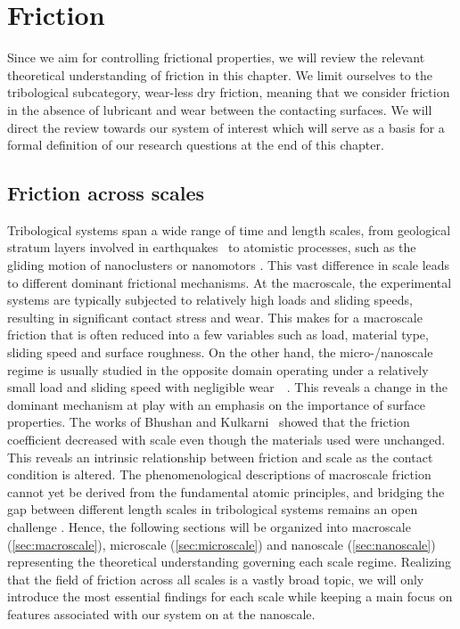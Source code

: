 
\chapter{Friction}\label{chap:friction} 
Since we aim for controlling frictional properties, we will review the relevant theoretical understanding of friction in this chapter. We limit ourselves to the tribological subcategory, wear-less dry friction, meaning that we consider friction in the absence of lubricant and wear between the contacting surfaces. We will direct the review towards our system of interest which will serve as a basis for a formal definition of our research questions at the end of this chapter.



\section{Friction across scales}
Tribological systems span a wide range of time and length scales, from
geological stratum layers involved in earthquakes~\cite{kim_nano-scale_2009} to
atomistic processes, such as the gliding motion of nanoclusters or nanomotors
\cite{Manini_2016}. This vast difference in scale leads to different dominant
frictional mechanisms. At the macroscale, the experimental systems are typically subjected to relatively high loads and sliding speeds, resulting in significant contact stress and wear. This makes for a macroscale friction that is often reduced into a few variables such as load, material type, sliding speed and surface roughness. On the other hand, the micro-/nanoscale regime is usually studied in the opposite domain operating under a relatively small load and sliding speed with negligible wear~\cite{kim_nano-scale_2009}~\cite[p. 5]{bhushan_2013}. This reveals a change in the dominant mechanism at play with an emphasis on the importance of surface properties. The works of Bhushan and Kulkarni~\cite{BHUSHAN199649} showed that the friction coefficient decreased with scale even though the materials used were unchanged. This reveals an intrinsic relationship between friction and scale as the contact condition is altered. The phenomenological descriptions of macroscale friction cannot yet be derived
from the fundamental atomic principles, and bridging the gap between different
length scales in tribological systems remains an open challenge
\cite{Manini_2016}. Hence, the following sections will be organized into
macroscale (\cref{sec:macroscale}), microscale (\cref{sec:microscale}) and
nanoscale (\cref{sec:nanoscale}) representing the theoretical understanding
governing each scale regime. Realizing that the field of friction across all
scales is a vastly broad topic, we will only introduce the most essential findings for each scale while keeping a main focus on features associated with our system on at the nanoscale.


